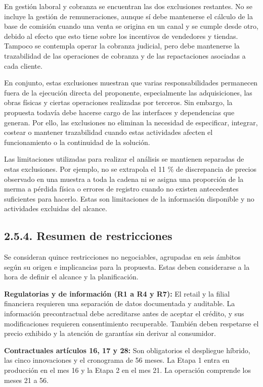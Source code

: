 \documentclass[11pt]{article}
\begin{document}
En gestión laboral y cobranza se encuentran las dos exclusiones restantes. No se incluye la gestión de remuneraciones, aunque sí debe mantenerse el cálculo de la base de comisión cuando una venta se origina en un canal y se cumple desde otro, debido al efecto que esto tiene sobre los incentivos de vendedores y tiendas. Tampoco se contempla operar la cobranza judicial, pero debe mantenerse la trazabilidad de las operaciones de cobranza y de las repactaciones asociadas a cada cliente.

En conjunto, estas exclusiones muestran que varias responsabilidades permanecen fuera de la ejecución directa del proponente, especialmente las adquisiciones, las obras físicas y ciertas operaciones realizadas por terceros. Sin embargo, la propuesta todavía debe hacerse cargo de las interfaces y dependencias que generan. Por ello, las exclusiones no eliminan la necesidad de especificar, integrar, costear o mantener trazabilidad cuando estas actividades afecten el funcionamiento o la continuidad de la solución.

Las limitaciones utilizadas para realizar el análisis se mantienen separadas de estas exclusiones. Por ejemplo, no se extrapola el 11 \% de discrepancia de precios observado en una muestra a toda la cadena ni se asigna una proporción de la merma a pérdida física o errores de registro cuando no existen antecedentes suficientes para hacerlo. Estas son limitaciones de la información disponible y no actividades excluidas del alcance.

\subsection{2.5.4. Resumen de restricciones}\label{resumen-de-restricciones}

Se consideran quince restricciones no negociables, agrupadas en seis ámbitos según su origen e implicancias para la propuesta. Estas deben considerarse a la hora de definir el alcance y la planificación.

\textbf{Regulatorias y de información (R1 a R4 y R7):} El retail y la filial financiera requieren una separación de datos documentada y auditable. La información precontractual debe acreditarse antes de aceptar el crédito, y sus modificaciones requieren consentimiento recuperable. También deben respetarse el precio exhibido y la atención de garantías sin derivar al consumidor.

\textbf{Contractuales artículos 16, 17 y 28:} Son obligatorios el despliegue híbrido, las cinco innovaciones y el cronograma de 56 meses. La Etapa 1 entra en producción en el mes 16 y la Etapa 2 en el mes 21. La operación comprende los meses 21 a 56.
\end{document}
